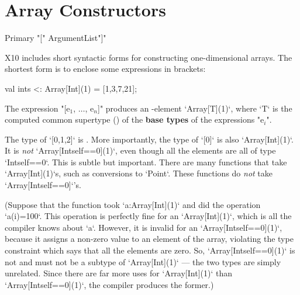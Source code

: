 \section{Array Constructors}
\label{sect:ArrayCtors}


\begin{bbgrammar}
             Primary \: 
                    \xcd"[" ArgumentList\opt \xcd"]" 
\end{bbgrammar}

X10 includes short syntactic forms for constructing one-dimensional arrays.
The shortest form is to enclose some expressions in brackets: 
\begin{xten}
val ints <: Array[Int](1) = [1,3,7,21];
\end{xten}

The expression \xcdmath"[e$_1$, $\ldots$, e$_n$]" produces an -element
\xcd`Array[T](1)`, where \xcd`T` is the computed common supertype () of the {\bf
base types} of the expressions  \xcdmath"e$_i$". 

\begin{ex}
The type of
\xcd`[0,1,2]` is .    
More importantly, the type of 
\xcd`[0]` is also \xcd`Array[Int](1)`.  It is {\em not} 
\xcd`Array[Int{self==0}](1)`, even though all the elements are all 
of type \xcd`Int{self==0}`.  This is subtle but important. There are many
functions that take \xcd`Array[Int](1)`s, such as conversions to \xcd`Point`.
These functions do {\em not} take
\xcd`Array[Int{self==0}]`'s.

(Suppose that the function took \xcd`a:Array[Int](1)` and did 
the operation \xcd`a(i)=100`.   This operation is perfectly fine for
an \xcd`Array[Int](1)`, which is all the compiler knows about \xcd`a`.  
However, it is invalid for an \xcd`Array[Int{self==0}](1)`, because it assigns
a non-zero value to an element of the array, violating the type constraint
which says that all the elements are zero.  So, \xcd`Array[Int{self==0}](1)`
is not and must not be a subtype of \xcd`Array[Int](1)` --- the two types are simply unrelated.
Since there are far more uses for \xcd`Array[Int](1)` than
\xcd`Array[Int{self==0}](1)`, the compiler produces the former.)
\end{ex}



